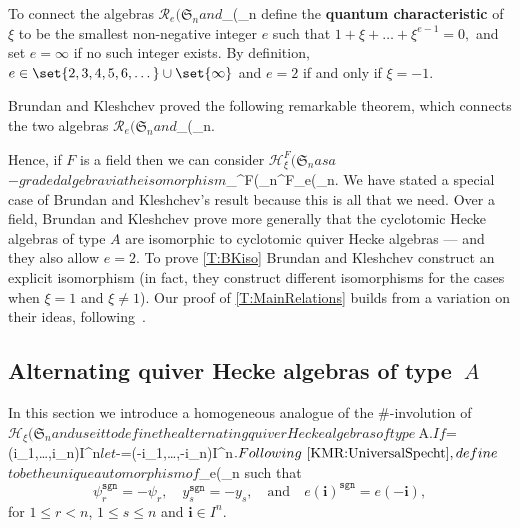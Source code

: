 \documentclass[leqno]{amsart}
\theoremstyle{plain}
\numberwithin{mainCorollary}{mainTheorem}
\numberwithin{equation}{section}
{\newaliascnt{{Assumption}}{equation}
\newtheorem{{Assumption}}[{Assumption}]{{Assumption}}
\aliascntresetthe{{Assumption}}
\expandafterautorefname\endcsname{{Assumption}}
}
{\newaliascnt{{Proposition}}{equation}
\newtheorem{{Proposition}}[{Proposition}]{{Proposition}}
\aliascntresetthe{{Proposition}}
\expandafterautorefname\endcsname{{Proposition}}
}
{\newaliascnt{{Theorem}}{equation}
\newtheorem{{Theorem}}[{Theorem}]{{Theorem}}
\aliascntresetthe{{Theorem}}
\expandafterautorefname\endcsname{{Theorem}}
}
{\newaliascnt{{Corollary}}{equation}
\newtheorem{{Corollary}}[{Corollary}]{{Corollary}}
\aliascntresetthe{{Corollary}}
\expandafterautorefname\endcsname{{Corollary}}
}
{\newaliascnt{{Conjecture}}{equation}
\newtheorem{{Conjecture}}[{Conjecture}]{{Conjecture}}
\aliascntresetthe{{Conjecture}}
\expandafterautorefname\endcsname{{Conjecture}}
}
{\newaliascnt{{Lemma}}{equation}
\newtheorem{{Lemma}}[{Lemma}]{{Lemma}}
\aliascntresetthe{{Lemma}}
\expandafterautorefname\endcsname{{Lemma}}
}
\theoremstyle{definition}
{\newaliascnt{{Definition}}{equation}
\newtheorem{{Definition}}[{Definition}]{{Definition}}
\aliascntresetthe{{Definition}}
\expandafterautorefname\endcsname{{Definition}}
}
\theoremstyle{remark}
{\newaliascnt{{Remark}}{equation}
\newtheorem{{Remark}}[{Remark}]{{Remark}}
\aliascntresetthe{{Remark}}
\expandafterautorefname\endcsname{{Remark}}
}
\begin{document}
{{To connect the algebras ${\mathscr{R}_e({\mathfrak{S}_{n}}} and ${{}_\xi({_{n}}} define the \textbf{quantum
characteristic} of $\xi$ to be the smallest non-negative integer $e$
such that $1+\xi+\dots+\xi^{e-1}=0,$ and set $e=\infty$ if no such
integer exists.  By definition,
$e\in\set{2,3,4,5,6,\dots}\cup\set{\infty}$ and $e=2$ if and only if
$\xi=-1$.

Brundan and Kleshchev proved the following remarkable theorem, which
connects the two algebras ${\mathscr{R}_e({\mathfrak{S}_{n}}} and ${{}_\xi({_{n}}}.


Hence, if $F$ is a field then we can consider ${{}_\xi^{F}({_{n}}} as a ${}$-graded
algebra via the isomorphism ${{}_\xi^{F}({_{n}}}{^{F}_e({_{n}}}. We have stated a special
case of Brundan and Kleshchev's result because this is all that we need.
Over a field, Brundan and Kleshchev prove more generally that the cyclotomic Hecke
algebras of type $A$ are isomorphic to cyclotomic quiver Hecke algebras
--- and they also allow $e=2$. To prove \autoref{T:BKiso}
Brundan and Kleshchev construct an explicit isomorphism (in fact, they
construct different isomorphisms for the cases when $$ and
$\xi{}$). Our proof of \autoref{T:MainRelations} builds from a
variation on their ideas, following~\cite{HuMathas:SeminormalQuiver}.

\subsection{Alternating quiver Hecke algebras of type~$A$}
In this section we introduce a homogeneous analogue of the
$\#$-involution of~${{}_\xi({_{n}}} and use it to define the alternating quiver
Hecke algebras of type~$A$.

If ${}=(i_1,\dots,i_n)\in I^n$ let $-{}=(-i_1,\dots,-i_n)\in I^n$.
Following~\cite[(3.14)]{KMR:UniversalSpecht}, define ${}$ to be the unique
automorphism of ${_e({_{n}}} such that
\[
\psi_r^{\mathtt{sgn}}= -\psi_r,\quad y_s^{\mathtt{sgn}}= -y_s,\quad\text{and}\quad e({{\mathbf{i}}})^{\mathtt{sgn}}= e(-{{\mathbf{i}}}),
\]
for $1\le r<n$, $1\le s\le n$ and ${}\in I^n$.

}}
\end{document}
